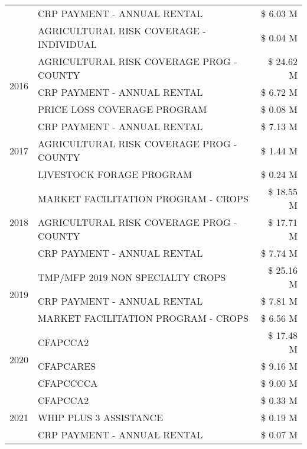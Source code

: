 \begin{tabular}{llr}
 & CRP PAYMENT - ANNUAL RENTAL & \$ 6.03 M \\
 & AGRICULTURAL RISK COVERAGE - INDIVIDUAL & \$ 0.04 M \\
\cline{1-3}
\multirow[t]{3}{*}{2016} & AGRICULTURAL RISK COVERAGE PROG - COUNTY & \$ 24.62 M \\
 & CRP PAYMENT - ANNUAL RENTAL & \$ 6.72 M \\
 & PRICE LOSS COVERAGE PROGRAM & \$ 0.08 M \\
\cline{1-3}
\multirow[t]{3}{*}{2017} & CRP PAYMENT - ANNUAL RENTAL & \$ 7.13 M \\
 & AGRICULTURAL RISK COVERAGE PROG - COUNTY & \$ 1.44 M \\
 & LIVESTOCK FORAGE PROGRAM & \$ 0.24 M \\
\cline{1-3}
\multirow[t]{3}{*}{2018} & MARKET FACILITATION PROGRAM - CROPS & \$ 18.55 M \\
 & AGRICULTURAL RISK COVERAGE PROG - COUNTY & \$ 17.71 M \\
 & CRP PAYMENT - ANNUAL RENTAL & \$ 7.74 M \\
\cline{1-3}
\multirow[t]{3}{*}{2019} & TMP/MFP 2019 NON SPECIALTY CROPS & \$ 25.16 M \\
 & CRP PAYMENT - ANNUAL RENTAL & \$ 7.81 M \\
 & MARKET FACILITATION PROGRAM - CROPS & \$ 6.56 M \\
\cline{1-3}
\multirow[t]{3}{*}{2020} & CFAPCCA2 & \$ 17.48 M \\
 & CFAPCARES & \$ 9.16 M \\
 & CFAPCCCCA & \$ 9.00 M \\
\cline{1-3}
\multirow[t]{3}{*}{2021} & CFAPCCA2 & \$ 0.33 M \\
 & WHIP PLUS 3 ASSISTANCE & \$ 0.19 M \\
 & CRP PAYMENT - ANNUAL RENTAL & \$ 0.07 M \\
\cline{1-3}
\bottomrule
\end{tabular}
